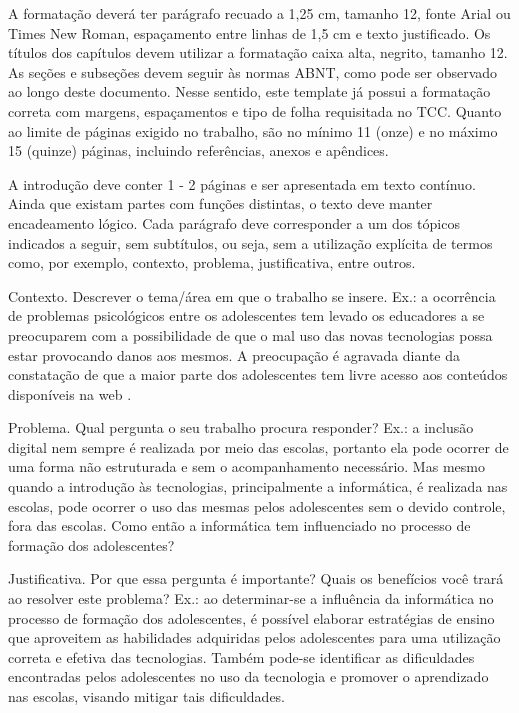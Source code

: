 A formatação deverá ter parágrafo recuado a 1,25 cm, tamanho 12, fonte Arial ou Times New Roman, espaçamento entre linhas de 1,5 cm e texto justificado. Os títulos dos capítulos devem utilizar a formatação caixa alta, negrito, tamanho 12. As seções e subseções devem seguir às normas ABNT, como pode ser observado ao longo deste documento. Nesse sentido, este template já possui a formatação correta com margens, espaçamentos e tipo de folha requisitada no TCC. Quanto ao limite de páginas exigido no trabalho, são no mínimo 11 (onze) e no máximo 15 (quinze) páginas, incluindo referências, anexos e apêndices.

A introdução deve conter 1 - 2 páginas e ser apresentada em texto contínuo. Ainda que existam partes com funções distintas, o texto deve manter encadeamento lógico. Cada parágrafo deve corresponder a um dos tópicos indicados a seguir, sem subtítulos, ou seja, sem a utilização explícita de termos como, por exemplo, contexto, problema, justificativa, entre outros.

	Contexto. Descrever o tema/área em que o trabalho se insere. 
	Ex.: a ocorrência de problemas psicológicos entre os adolescentes tem levado os educadores a se preocuparem com a possibilidade de que o mal uso das novas tecnologias possa estar provocando danos aos mesmos. A preocupação é agravada diante da constatação de que a maior parte dos adolescentes tem livre acesso aos conteúdos disponíveis na web \cite{citelli2004,martins2012}.
	
 Problema. Qual pergunta o seu trabalho procura responder? 
	Ex.: a inclusão digital nem sempre é realizada por meio das escolas, portanto ela pode ocorrer de uma forma não estruturada e sem o acompanhamento necessário. Mas mesmo quando a introdução às tecnologias, principalmente a informática, é realizada nas escolas, pode ocorrer o uso das mesmas pelos adolescentes sem o devido controle, fora das escolas. Como então a informática tem influenciado no processo de formação dos adolescentes?
	
 Justificativa. Por que essa pergunta é importante? Quais os benefícios você trará ao resolver este problema?
	Ex.: ao determinar-se a influência da informática no processo de formação dos adolescentes, é possível elaborar estratégias de ensino que aproveitem as habilidades adquiridas pelos adolescentes para uma utilização correta e efetiva das tecnologias. Também pode-se identificar as dificuldades encontradas pelos adolescentes no uso da tecnologia e promover o aprendizado nas escolas, visando mitigar tais dificuldades.
	
